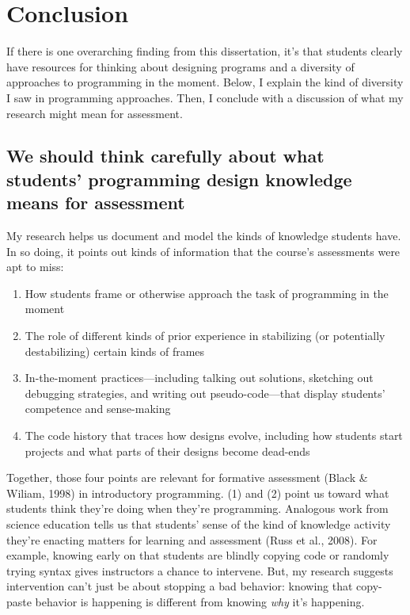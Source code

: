 \section{Conclusion}\label{conclusion-2}

If there is one overarching finding from this dissertation, it's that
students clearly have resources for thinking about designing programs
and a diversity of approaches to programming in the moment. Below, I
explain the kind of diversity I saw in programming approaches. Then, I
conclude with a discussion of what my research might mean for
assessment.

\subsection{We should think carefully about what students' programming
design knowledge means for
assessment}\label{we-should-think-carefully-about-what-students-programming-design-knowledge-means-for-assessment}

My research helps us document and model the kinds of knowledge students
have. In so doing, it points out kinds of information that the course's
assessments were apt to miss:

\begin{enumerate}
\def\labelenumi{\arabic{enumi}.}
\item
  How students frame or otherwise approach the task of programming in
  the moment
\item
  The role of different kinds of prior experience in stabilizing (or
  potentially destabilizing) certain kinds of frames
\item
  In-the-moment practices---including talking out solutions, sketching
  out debugging strategies, and writing out pseudo-code---that display
  students' competence and sense-making
\item
  The code history that traces how designs evolve, including how
  students start projects and what parts of their designs become
  dead-ends
\end{enumerate}

Together, those four points are relevant for formative assessment (Black
\& Wiliam, 1998) in introductory programming. (1) and (2) point us
toward what students think they're doing when they're programming.
Analogous work from science education tells us that students' sense of
the kind of knowledge activity they're enacting matters for learning and
assessment (Russ et al., 2008). For example, knowing early on that
students are blindly copying code or randomly trying syntax gives
instructors a chance to intervene. But, my research suggests
intervention can't just be about stopping a bad behavior: knowing that
copy-paste behavior is happening is different from knowing \emph{why}
it's happening.

